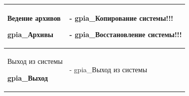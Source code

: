 \begin{table}[h!p]
\begin{tabular}{|p{8cm}|p{9cm}|}

Ведение архивов \par
\hspace{0pt} \par
\textbf{gpia\_Архивы}
&
- gpia\_Копирование системы!!! \par
- gpia\_Восстановление системы!!!
\\ \hline


Выход из системы \par
\hspace{0pt} \par
\textbf{gpia\_Выход}
&
- gpia\_Выход из системы
\\ \hline


    \end{tabular}
\end{table}

\newpage
